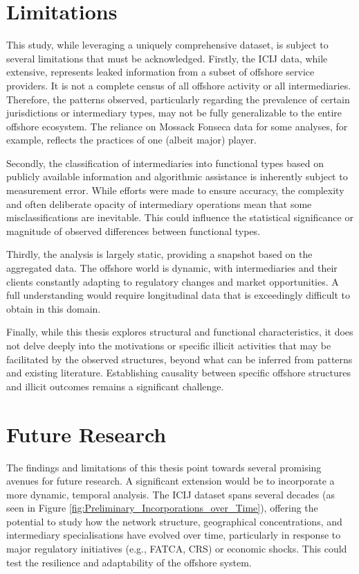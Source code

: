 \section{Limitations}
\label{sec:limitations}

This study, while leveraging a uniquely comprehensive dataset, is subject to several limitations that must be acknowledged. Firstly, the ICIJ data, while extensive, represents leaked information from a subset of offshore service providers. It is not a complete census of all offshore activity or all intermediaries. Therefore, the patterns observed, particularly regarding the prevalence of certain jurisdictions or intermediary types, may not be fully generalizable to the entire offshore ecosystem. The reliance on Mossack Fonseca data for some analyses, for example, reflects the practices of one (albeit major) player.

Secondly, the classification of intermediaries into functional types based on publicly available information and algorithmic assistance is inherently subject to measurement error. While efforts were made to ensure accuracy, the complexity and often deliberate opacity of intermediary operations mean that some misclassifications are inevitable. This could influence the statistical significance or magnitude of observed differences between functional types.

Thirdly, the analysis is largely static, providing a snapshot based on the aggregated data. The offshore world is dynamic, with intermediaries and their clients constantly adapting to regulatory changes and market opportunities. A full understanding would require longitudinal data that is exceedingly difficult to obtain in this domain.

Finally, while this thesis explores structural and functional characteristics, it does not delve deeply into the motivations or specific illicit activities that may be facilitated by the observed structures, beyond what can be inferred from patterns and existing literature. Establishing causality between specific offshore structures and illicit outcomes remains a significant challenge.

\section{Future Research}
\label{sec:future_research}

The findings and limitations of this thesis point towards several promising avenues for future research.
A significant extension would be to incorporate a more dynamic, temporal analysis. The ICIJ dataset spans several decades (as seen in Figure \ref{fig:Preliminary_Incorporations_over_Time}), offering the potential to study how the network structure, geographical concentrations, and intermediary specialisations have evolved over time, particularly in response to major regulatory initiatives (e.g., FATCA, CRS) or economic shocks. This could test the resilience and adaptability of the offshore system.

